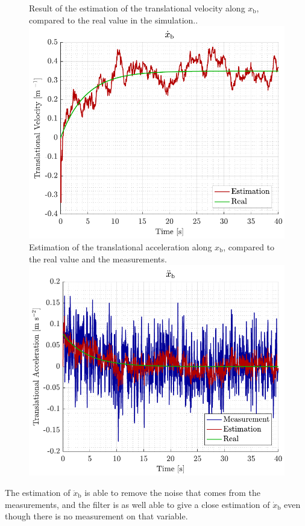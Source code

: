 \begin{figure}[H]
    \captionbox 
    {   
        Result of the estimation of the translational velocity along $x_\mathrm{b}$, compared to the real value in the simulation..
        \label{fig:sim_xbdot}
    }                                                                 
    {                                                                  
        \includegraphics[width=.45\textwidth]{figures/sim_xbdot}         
    }                                                                    
    \hspace{5pt}                                                          
    \captionbox  
    {      
        Estimation of the translational acceleration along $x_\mathrm{b}$, compared to the real value and the measurements.
        \label{fig:sim_xbddot}
    }                                                                          
    {
        \includegraphics[width=.45\textwidth]{figures/sim_xbddot}
    }
\end{figure}

The estimation of $\ddot{x}_\mathrm{b}$ is able to remove the noise that comes from the measurements, and the filter is as well able to give a close estimation of $\dot{x}_\mathrm{b}$ even though there is no measurement on that variable.
